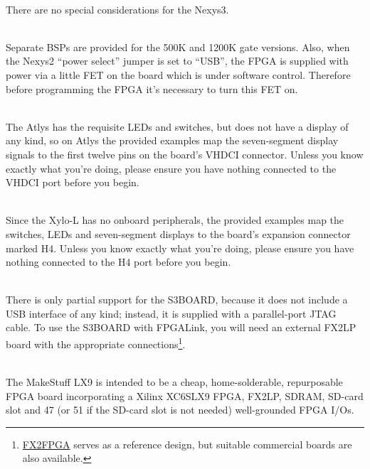 \begin{desc}
  \item[\sffamily{\href{http://www.digilentinc.com/Products/Detail.cfm?Prod=Nexys3}{Digilent Nexys3}:}] \hfill \\
    There are no special considerations for the Nexys3.
  \item[\sffamily{\href{http://www.digilentinc.com/Products/Detail.cfm?Prod=NEXYS2}{Digilent Nexys2 (500K \& 1200K versions)}:}] \hfill \\
    Separate BSPs are provided for the 500K and 1200K gate versions. Also, when the Nexys2 ``power select'' jumper is set to ``USB'', the FPGA is supplied with power via a little FET on the board which is under software control. Therefore before programming the FPGA it's necessary to turn this FET on.
  \item[\sffamily{\href{http://www.digilentinc.com/Products/Detail.cfm?Prod=ATLYS}{Digilent Atlys}:}] \hfill \\
    The Atlys has the requisite LEDs and switches, but does not have a display of any kind, so on Atlys the provided examples map the seven-segment display signals to the first twelve pins on the board's VHDCI connector. Unless you know exactly what you're doing, please ensure you have nothing connected to the VHDCI port before you begin.
  \item[\sffamily{\href{http://www.knjn.com/shop.html?pg=pic&src=images/Board_Xylo-L_details.jpg\&title=The\%20Xylo-L\%20board}{KNJN Xylo-L}:}] \hfill \\
    Since the Xylo-L has no onboard peripherals, the provided examples map the switches, LEDs and seven-segment displays to the board's expansion connector marked H4. Unless you know exactly what you're doing, please ensure you have nothing connected to the H4 port before you begin.
  \item[\sffamily{\href{http://www.digilentinc.com/Products/Detail.cfm?Prod=S3BOARD}{Digilent S3BOARD}:}] \hfill \\
    There is only partial support for the S3BOARD, because it does not include a USB interface of any kind; instead, it is supplied with a parallel-port JTAG cable. To use the S3BOARD with FPGALink, you will need an external FX2LP board with the appropriate connections\footnote{\href{http://www.makestuff.eu/wordpress/?page_id=446}{FX2FPGA} serves as a reference design, but suitable commercial boards are also available.}.
  \item[\sffamily{\href{http://www.makestuff.eu/wordpress/electronics/lx9-fpga-board}{MakeStuff LX9}:}] \hfill \\
    The MakeStuff LX9 is intended to be a cheap, home-solderable, repurposable FPGA board incorporating a Xilinx XC6SLX9 FPGA, FX2LP, SDRAM, SD-card slot and 47 (or 51 if the SD-card slot is not needed) well-grounded FPGA I/Os.
\end{desc}

